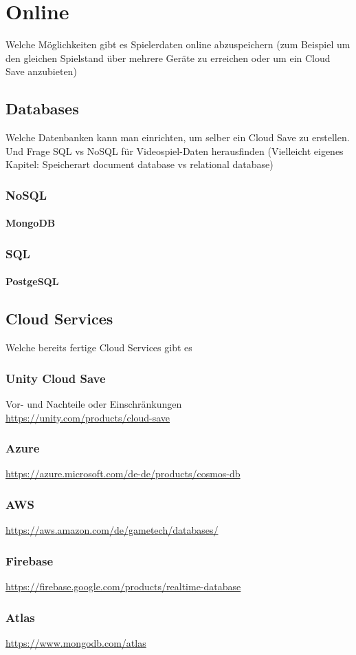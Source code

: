\chapter{Online}\label{ch:online}
Welche Möglichkeiten gibt es Spielerdaten online abzuspeichern (zum Beispiel um den gleichen Spielstand über mehrere Geräte zu erreichen oder um ein Cloud Save anzubieten)

\section{Databases}
Welche Datenbanken kann man einrichten, um selber ein Cloud Save zu erstellen. Und Frage SQL vs NoSQL für Videospiel-Daten herausfinden (Vielleicht eigenes Kapitel: Speicherart document database vs relational database)

\subsection{NoSQL}
\subsubsection{MongoDB}

\subsection{SQL}
\subsubsection{PostgeSQL}

\section{Cloud Services}
Welche bereits fertige Cloud Services gibt es

\subsection{Unity Cloud Save} 
Vor- und Nachteile oder Einschränkungen\\
\url{https://unity.com/products/cloud-save}

\subsection{Azure}
\url{https://azure.microsoft.com/de-de/products/cosmos-db}

\subsection{AWS}
\url{https://aws.amazon.com/de/gametech/databases/}

\subsection{Firebase}
\url{https://firebase.google.com/products/realtime-database}

\subsection{Atlas}
\url{https://www.mongodb.com/atlas}